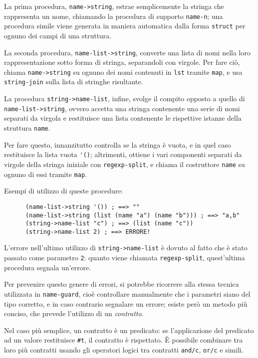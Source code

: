 La prima procedura, \lstinline{name->string}, estrae semplicemente la
stringa che rappresenta un nome, chiamando la procedura di supporto
\lstinline{name-n}; una procedura simile viene generata in maniera
automatica dalla forma \lstinline{struct} per ognuno dei campi di una
struttura.

La seconda procedura, \lstinline{name-list->string}, converte una lista
di nomi nella loro rappresentazione sotto forma di stringa, separandoli
con virgole. Per fare ci\`o, chiama \lstinline{name->string} su ognuno dei
nomi contenuti in \lstinline{lst} tramite \lstinline{map}, e usa
\lstinline{string-join} sulla lista di stringhe risultante.

La procedura \lstinline{string->name-list}, infine, svolge il compito
opposto a quello di \lstinline{name-list->string}, ovvero accetta una
stringa contenente una serie di nomi separati da virgola e restituisce una
lista contenente le rispettive istanze della struttura \lstinline{name}.

Per fare questo, innanzitutto controlla se la stringa \`e vuota, e in quel
caso restituisce la lista vuota \lstinline{'()}; altrimenti, ottiene i vari
componenti separati da virgole della stringa iniziale con
\lstinline{regexp-split}, e chiama il costruttore \lstinline{name} su
ognuno di essi tramite \lstinline{map}.

Esempi di utilizzo di queste procedure:

\begin{lstlisting}
      (name-list->string '()) ; ==> ""
      (name-list->string (list (name "a") (name "b"))) ; ==> "a,b"
      (string->name-list "c") ; ==> (list (name "c"))
      (string->name-list 2) ; ==> ERRORE!
\end{lstlisting}

L'errore nell'ultimo utilizzo di \lstinline{string->name-list} \`e dovuto
al fatto che \`e stato passato come parametro \lstinline{2}: quanto viene
chiamata \lstinline{regexp-split}, quest'ultima procedura segnala un'errore.

Per prevenire questo genere di errori, si potrebbe ricorrere alla stessa
tecnica utilizzata in \lstinline{name-guard}, cio\`e controllare manualmente
che i parametri siano del tipo corretto, e in caso contrario segnalare un
errore; esiste per\`o un metodo pi\`u conciso, che prevede l'utilizzo di
un \emph{contratto}.

Nel caso pi\`u semplice, un contratto \`e un predicato: se l'applicazione
del predicato ad un valore restituisce \lstinline{#t}, il contratto \`e
rispettato. \`E possibile combinare tra loro pi\`u contratti usando gli
operatori logici tra contratti \lstinline{and/c}, \lstinline{or/c} e simili.

